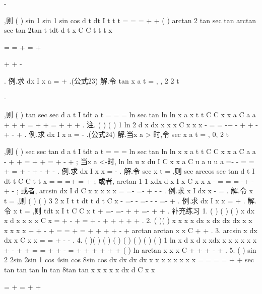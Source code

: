 \in -




,则
(
)
sin
1 sin
1 sin
cos
d
t
dt
I
t
t
t
=
=
=
+
+
\int 
\int 
(
)
arctan
2 tan
sec
tan
arctan
sec
tan
2tan
t
tdt
d
t
x
C
C
t
t
t
x


=
=
+
=
+




+
+
-


\int 
\int 
. 
\textcolor{lyred}{例}.求
dx
I
x
a
=
+
\int 
.(公式23) 
解.令
tan
x
a
t
=
,
,
2 2
t
\pi \pi 


\in -




,则
(
)
tan
sec
sec
d a
t
I
tdt
a
t
=
=
=
\int 
\int 
ln sec
tan
ln
ln
x
a
x
t
t
C
C
x
x
a
C
a
a
+
+
+
=
+
+
=
+
+
+
. 
\textcolor{lyred}{注}.
(
)
(
)
1 ln 2
d
x
dx
x
x
x
C
x
x
x
-
=
=
-+
-
+
+
-
+
-
+
\int 
\int 
. 
\textcolor{lyred}{例}.求
dx
I
x
a
=
-
\int 
.(公式24) 
解.当x
a
>
时,令
sec
x
a
t
=
,
0, 2
t
\pi 


\in 



,则
(
)
sec
sec
tan
d a
t
I
tdt
a
t
=
=
=
\int 
\int 
ln sec
tan
ln
ln
x
x
a
t
t
C
C
x
x
a
C
a
a
-
+
+
=
+
+
=
+
-
+
; 
当x
a
<-时,
ln
ln
u
x
du
I
C
x
x
a
C
u
a
u
u
a
=-
-
=
=
+
=
+
-
+
-
+
-
\int 
. 
\textcolor{lyred}{例}.求
dx
I
x x
=
-
\int 
. 
解.令
sec
x
t
=
,则
sec
arccos
sec tan
d
t
I
dt
t
C
C
t
t
x
=
=
\cdots 
=+
=
+
\int 
\int 
; 
或者,
arctan
1 1
xdx
d
x
I
x
C
x
x
x
-
=
=
=
-+
-+
-
\int 
\int 
; 
或者,
arcsin
dx
I
d
C
x
x
x
x
x
=
=-
=-
+
-
-
\int 
\int 
. 
\textcolor{lyred}{例}.求
x
I
dx
x
-
=\int 
. 
解.令
x
t
=
,则
(
)
(
)
3 2
x
I
t t
dt
t
d t
C
x
-
=-
-
=-
-
-
=-
+
\int 
\int 
. 
\textcolor{lyred}{例}.求
dx
I
x
x
=
+
\int 
. 
解.令
x
t
=
,则
tdt
x
I
t
C
C
x
t
+
=-
=-
+
+
=-
+
+
\int 
. 
\textcolor{lyred}{补充练习 }
1.
(
)
(
)
(
)
x dx
x
d
x
x
x
x
C
x
=
+
-
+
=
+
-
+
+
+
+
+
\int 
\int 
. 
2.
(
)(
)
x
x
x
x
dx
x
dx
dx
dx
x
x
x
x
x
x
+
+
-
+
=
=
+
=
+
+
+
+
-
+
\int 
\int 
\int 
\int 
arctan
arctan
x
x
C
+
+
. 
3.
arcsin
x
dx
dx
x
C
x
x
=
=
+
-
-
\int 
\int 
. 
4.
(
)(
)
(
)
(
)
(
)
(
)
(
)
(
)
1 ln
x
d x
d x
xdx
x
x
x
x
x
x
+
-
+
+
=
=
+
+
-
=
+
+
+
+
+
+
\int 
\int 
\int 
(
)
ln
arctan
x
x
x
C
+
+
+
-
+
. 
5.
(
)
sin 2
2sin
2sin
1 cos
4sin cos
8sin
cos
dx
dx
dx
dx
x
x
x
x
x
x
x
x
=
=
=
=
+
+
\int 
\int 
\int 
\int 
sec
tan
tan
tan
ln tan
8tan
tan
x
x
x
x
x
dx
d
C
x
x




=
+
=
+
+








